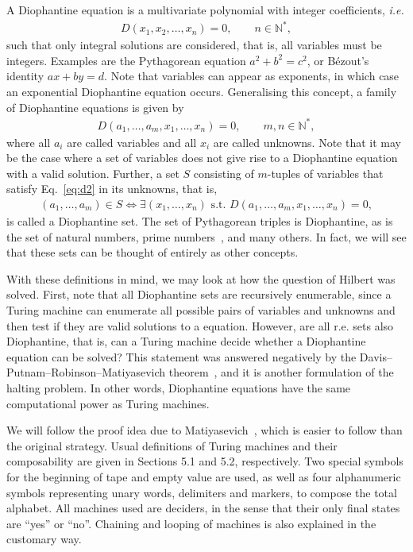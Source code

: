 \documentclass[12pt]{article}
\begin{document}
A Diophantine equation is a multivariate polynomial with integer coefficients,
\emph{i.e.}
\begin{align}
    D(x_{1}, x_{2}, \dots, x_{n}) = 0, \qquad n \in \mathbb{N}^{*},
        \label{eq:d1}
\end{align}
such that only integral solutions are considered, that is, all variables must
be integers. Examples are the Pythagorean equation $a^{2} + b^{2} = c^{2}$, or
Bézout's identity $ax + by = d$. Note that variables can appear as exponents,
in which case an exponential Diophantine equation occurs. Generalising this
concept, a family of Diophantine equations is given by
\begin{align}
    D(a_{1}, \dots, a_{m}, x_{1}, \dots, x_{n}) = 0, \qquad m, n \in
        \mathbb{N}^{*}, \label{eq:d2}
\end{align}
where all $a_{i}$ are called variables and all $x_{i}$ are called unknowns.
Note that it may be the case where a set of variables does not give rise to a
Diophantine equation with a valid solution. Further, a set $S$ consisting of
$m$-tuples of variables that satisfy Eq.~\ref{eq:d2} in its unknowns, that is,
\begin{align}
    (a_{1}, \dots, a_{m}) \in S \Leftrightarrow \exists (x_{1}, \dots, x_{n})
        \text{ s.t. } D(a_{1}, \dots, a_{m}, x_{1}, \dots, x_{n}) = 0,
\end{align}
is called a Diophantine set. The set of Pythagorean triples is Diophantine, as
is the set of natural numbers, prime numbers~\cite{Jones:article:1976:jun}, and
many others. In fact, we will see that these sets can be thought of entirely as
other concepts.

With these definitions in mind, we may look at how the question of Hilbert was
solved. First, note that all Diophantine sets are recursively enumerable, since
a Turing machine can enumerate all possible pairs of variables and unknowns and
then test if they are valid solutions to a equation. However, are all r.e. sets
also Diophantine, that is, can a Turing machine decide whether a Diophantine
equation can be solved? This statement was answered negatively by the
Davis--Putnam--Robinson--Matiyasevich
theorem~\cite{Matiyasevich:article:1970:jun}, and it is another formulation of
the halting problem. In other words, Diophantine equations have the same
computational power as Turing machines.

We will follow the proof idea due to Matiyasevich~\cite[Chap.
5]{Matiyasevich:book:1993}, which is easier to follow than the original
strategy. Usual definitions of Turing machines and their composability are
given in Sections 5.1 and 5.2, respectively. Two special symbols for the
beginning of tape and empty value are used, as well as four alphanumeric
symbols representing unary words, delimiters and markers, to compose the total
alphabet. All machines used are deciders, in the sense that their only final
states are ``yes'' or ``no''. Chaining and looping of machines is also
explained in the customary way.
\end{document}
